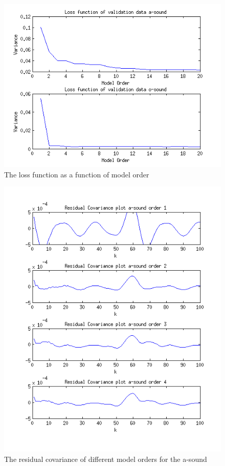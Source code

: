 \documentclass[12pt]{article}
\begin{document}
\begin{figure}[H]
  \centering
  \includegraphics[width=14cm]{loss_function_validation.png}
  \caption{
    \label{loss_function}
    The loss function as a function of model order}
\end{figure}

\begin{figure}[H]
  \centering
  \includegraphics[width=14cm]{residual_covariance_a.png}
  \caption{The residual covariance of different model orders for the a-sound}
\end{figure}
\end{document}

